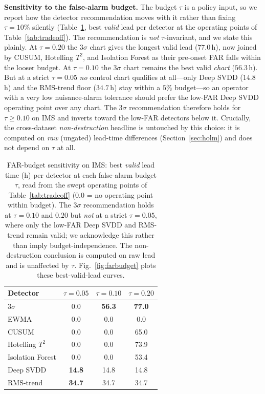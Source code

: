 \documentclass[journal]{IEEEtran}
\begin{document}
\textbf{Sensitivity to the false-alarm budget.} The budget $\tau$ is a policy input,
so we report how the detector recommendation moves with it rather than fixing
$\tau{=}10\%$ silently (Table~\ref{tab:farsens}, best \emph{valid} lead per detector at
the operating points of Table~\ref{tab:tradeoff}). The recommendation is \emph{not}
$\tau$-invariant, and we state this plainly. At $\tau{=}0.20$ the 3$\sigma$ chart gives
the longest valid lead ($77.0$\,h), now joined by CUSUM, Hotelling $T^2$, and Isolation
Forest as their pre-onset FAR falls within the looser budget. At $\tau{=}0.10$ the
3$\sigma$ chart remains the best valid \emph{chart} ($56.3$\,h). But at a strict
$\tau{=}0.05$ \emph{no} control chart qualifies at all---only Deep SVDD ($14.8$\,h) and
the RMS-trend floor ($34.7$\,h) stay within a $5\%$ budget---so an operator with a very
low nuisance-alarm tolerance should prefer the low-FAR Deep SVDD operating point over
any chart. The 3$\sigma$ recommendation therefore holds for $\tau\ge0.10$ on IMS and
inverts toward the low-FAR detectors below it. Crucially, the cross-dataset
\emph{non-destruction} headline is untouched by this choice: it is computed on
\emph{raw} (ungated) lead-time differences (Section~\ref{sec:holm}) and does not depend
on $\tau$ at all.

\begin{table}[t]
\caption{FAR-budget sensitivity on IMS: best \emph{valid} lead time (h) per detector at
each false-alarm budget $\tau$, read from the swept operating points of
Table~\ref{tab:tradeoff} ($0.0$ = no operating point within budget). The 3$\sigma$
recommendation holds at $\tau{=}0.10$ and $0.20$ but \emph{not} at a strict
$\tau{=}0.05$, where only the low-FAR Deep SVDD and RMS-trend remain valid; we
acknowledge this rather than imply budget-independence. The non-destruction conclusion
is computed on raw lead and is unaffected by $\tau$. Fig.~\ref{fig:farbudget} plots
these best-valid-lead curves.}
\label{tab:farsens}
\centering
\footnotesize
\setlength{\tabcolsep}{7pt}
\begin{tabular}{@{}lccc@{}}
\toprule
Detector & $\tau{=}0.05$ & $\tau{=}0.10$ & $\tau{=}0.20$ \\
\midrule
3$\sigma$        & \phantom{0}0.0 & \textbf{56.3} & \textbf{77.0} \\
EWMA             & \phantom{0}0.0 & \phantom{0}0.0 & \phantom{0}0.0 \\
CUSUM            & \phantom{0}0.0 & \phantom{0}0.0 & 65.0 \\
Hotelling $T^2$  & \phantom{0}0.0 & \phantom{0}0.0 & 73.9 \\
Isolation Forest & \phantom{0}0.0 & \phantom{0}0.0 & 53.4 \\
Deep SVDD        & \textbf{14.8} & 14.8 & 14.8 \\
RMS-trend        & \textbf{34.7} & 34.7 & 34.7 \\
\bottomrule
\end{tabular}
\end{table}
\end{document}
